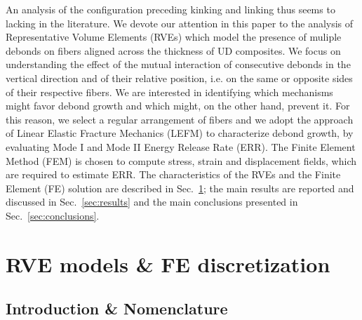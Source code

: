 \documentclass[smallextended]{svjour3}       %
\begin{document}
An analysis of the configuration preceding kinking and linking thus seems to lacking in the literature. We devote our attention in this paper to the analysis of Representative Volume Elements (RVEs) which model the presence of muliple debonds on fibers aligned across the thickness of UD composites. We focus on understanding the effect of the mutual interaction of consecutive debonds in the vertical direction and of their relative position, i.e. on the same or opposite sides of their respective fibers. We are interested in identifying which mechanisms might favor debond growth and which might, on the other hand, prevent it. For this reason, we select a regular arrangement of fibers and we adopt the approach of Linear Elastic Fracture Mechanics (LEFM) to characterize debond growth, by evaluating Mode I and Mode II Energy Release Rate (ERR). The Finite Element Method (FEM) is chosen to compute stress, strain and displacement fields, which are required to estimate ERR. The characteristics of the RVEs and the Finite Element (FE) solution are described in Sec.~\ref{sec:rveFem}; the main results are reported and discussed in Sec.~\ref{sec:results} and the main conclusions presented in Sec.~\ref{sec:conclusions}.


\section{RVE models \& FE discretization}\label{sec:rveFem}

\subsection{Introduction \& Nomenclature}\label{subsec:names}
\end{document}
